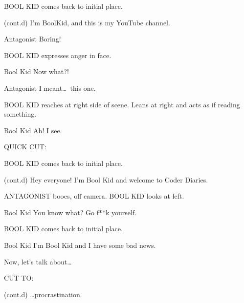 \documentclass{screenplay}[2018/01/07]
\begin{document}
    BOOL KID comes back to initial place.

    \begin{dialogue}{(cont.d)}
        I'm BoolKid, and this is my YouTube channel.
    \end{dialogue}

    \begin{dialogue}{Antagonist}
        Boring!
    \end{dialogue}

    BOOL KID expresses anger in face.

    \begin{dialogue}{Bool Kid}
        Now what?!
    \end{dialogue}

    \begin{dialogue}{Antagonist}
        I meant\dots\ this one.
    \end{dialogue}

    BOOL KID reaches at right side of scene. Leans at right and acts as if
    reading something.

    \begin{dialogue}{Bool Kid}
        Ah! I see.
    \end{dialogue}

    \begin{flushright}
        QUICK CUT:
    \end{flushright}

    BOOL KID comes back to initial place.

    \begin{dialogue}{(cont.d)}
        Hey everyone! I'm Bool Kid and welcome to Coder Diaries.
    \end{dialogue}

    ANTAGONIST booes, off camera.
    BOOL KID looks at left.

    \begin{dialogue}[shouting]{Bool Kid}
        You know what? Go f**k yourself.
    \end{dialogue}

    BOOL KID comes back to initial place.

    \begin{dialogue}{Bool Kid}
        I'm Bool Kid and I have some bad news.

        Now, let's talk about\dots
    \end{dialogue}

    \begin{flushright}
        CUT TO:
    \end{flushright}


    \begin{dialogue}{(cont.d)}
        \dots procrastination.
    \end{dialogue}
    \fadeout

    \theend
\end{document}

